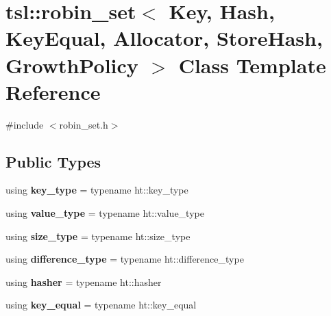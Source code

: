 \hypertarget{classtsl_1_1robin__set}{}\section{tsl\+::robin\+\_\+set$<$ Key, Hash, Key\+Equal, Allocator, Store\+Hash, Growth\+Policy $>$ Class Template Reference}
\label{classtsl_1_1robin__set}


{\ttfamily \#include $<$robin\+\_\+set.\+h$>$}

\subsection*{Public Types}
\begin{DoxyCompactItemize}
\item 
\mbox{\label{classtsl_1_1robin__set_a8db3e3872aca6e243c896f88629c1800}} 
using {\bfseries key\+\_\+type} = typename ht\+::key\+\_\+type
\item 
\mbox{\label{classtsl_1_1robin__set_a725215ee4af265be5e8b34278378fd33}} 
using {\bfseries value\+\_\+type} = typename ht\+::value\+\_\+type
\item 
\mbox{\label{classtsl_1_1robin__set_a5190354763170ba325832a003505209a}} 
using {\bfseries size\+\_\+type} = typename ht\+::size\+\_\+type
\item 
\mbox{\label{classtsl_1_1robin__set_ad077b340c8530c7d0f44d079944ca412}} 
using {\bfseries difference\+\_\+type} = typename ht\+::difference\+\_\+type
\item 
\mbox{\label{classtsl_1_1robin__set_a2f7364634a24fc8621e75a786a3b8eb3}} 
using {\bfseries hasher} = typename ht\+::hasher
\item 
\mbox{\label{classtsl_1_1robin__set_a87a4c66bea6d2374a4e672a07dab9cc6}} 
using {\bfseries key\+\_\+equal} = typename ht\+::key\+\_\+equal
\item 
\mbox{\label{classtsl_1_1robin__set_ac3df0f3c733fcc6a57eb1a4f8e5cd1e2}} 

\end{DoxyCompactItemize}
